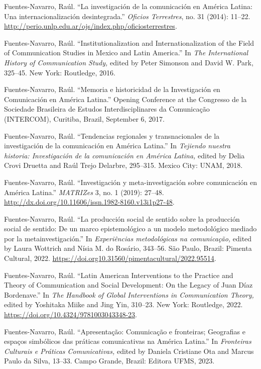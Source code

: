 \documentclass{tufte-handout}
\begin{document}
\begin{hangparas}{.25in}{1}
Fuentes-Navarro, Raúl. ``La investigación de la comunicación en América
Latina: Una internacionalización desintegrada.'' \emph{Oficios
Terrestres}, no. 31 (2014): 11--22.
\url{http://perio.unlp.edu.ar/ojs/index.php/oficiosterrestres}.

Fuentes-Navarro, Raúl. ``Institutionalization and Internationalization
of the Field of Communication Studies in Mexico and Latin America.'' In
\emph{The International History of Communication Study,} edited by Peter
Simonson and David W. Park, 325--45. New York: Routledge, 2016.

\pagebreak Fuentes-Navarro, Raúl. ``Memoria e historicidad de la Investigación en
Comunicación en América Latina.'' Opening Conference at the Congresso de la
Sociedade Brasileira de Estudos Interdisciplinares da Comunicação
(INTERCOM), Curitiba, Brazil, September 6, 2017.

Fuentes-Navarro, Raúl. ``Tendencias regionales y transnacionales de la
investigación de la comunicación en América Latina.'' In \emph{Tejiendo
nuestra historia: Investigación de la comunicación en América Latina,}
edited by Delia Crovi Druetta and Raúl Trejo Delarbre, 295--315. Mexico
City: UNAM, 2018.

Fuentes-Navarro, Raúl. ``Investigación y meta-investigación sobre
comunicación en América Latina.'' \emph{MATRIZes} 3, no. 1 (2019):
27--48. \url{http://dx.doi.org/10.11606/issn.1982-8160.v13i1p27-48}.

Fuentes-Navarro, Raúl. ``La producción social de sentido sobre la
producción social de sentido: De un marco epistemológico a un modelo
metodológico mediado por la metainvestigación.'' In \emph{Experiências
metodológicas na comunicação,} edited by Laura Wottrich and Nísia M. do
Rosário, 343--56. São Paulo, Brazil: Pimenta Cultural, 2022.
\url{https://doi.org10.31560/pimentacultural/2022.95514}.

Fuentes-Navarro, Raúl. ``Latin American Interventions to the Practice
and Theory of Communication and Social Development: On the Legacy of
Juan Díaz Bordenave.'' In \emph{The Handbook of Global Interventions in
Communication Theory,} edited by Yoshitaka Miike and Jing Yin, 310--23.
New York: Routledge, 2022.
\url{https://doi.org/10.4324/9781003043348-23}.

Fuentes-Navarro, Raúl. ``Apresentação: Comunicação e fronteiras;
Geografias e espaços simbólicos das práticas comunicativas na América
Latina.'' In \emph{Fronteiras Culturais e Práticas Comunicativas,}
edited by Daniela Cristiane Ota and Marcus Paulo da Silva, 13--33. Campo
Grande, Brazil: Editora UFMS, 2023.


\end{hangparas}
\end{document}
